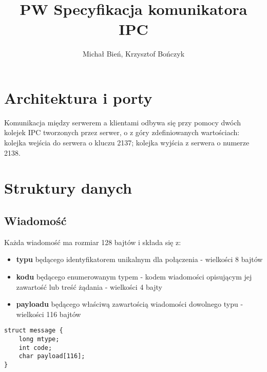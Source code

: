 \documentclass[a4paper]{article}
\author{Michał Bień, Krzysztof Bończyk}
\title{PW Specyfikacja komunikatora IPC}
\date{}
\begin{document}
\maketitle
\section{Architektura i porty}
Komunikacja między serwerem a klientami odbywa się przy pomocy dwóch kolejek IPC tworzonych przez serwer, o z góry zdefiniowanych wartościach: kolejka wejścia do serwera o kluczu 2137; kolejka wyjścia z serwera o numerze 2138.
\section{Struktury danych}
\subsection{Wiadomość}
Każda wiadomość ma rozmiar 128 bajtów i składa się z:
\begin{itemize}
\item \textbf{typu} będącego identyfikatorem unikalnym dla połączenia - wielkości 8 bajtów
\item \textbf{kodu} będącego enumerowanym typem - kodem wiadomości opisującym jej zawartość lub treść żądania - wielkości 4 bajty
\item \textbf{payloadu} będącego właściwą zawartością wiadomości dowolnego typu - wielkości 116 bajtów
\end{itemize}
\begin{verbatim}
struct message {
	long mtype;
	int code;
	char payload[116];
}
\end{verbatim}
\end{document}
